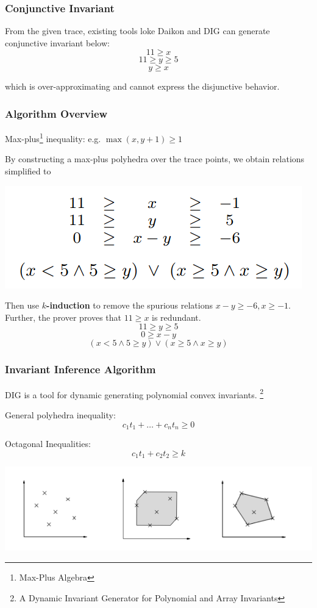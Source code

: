 \documentclass[11pt]{beamer}
\begin{document}
\begin{frame}\frametitle{Conjunctive Invariant}
From the given trace, existing tools loke Daikon and DIG can generate conjunctive invariant below:
\[11\ge x\]\[11 \ge y \ge 5\]\[y \ge x\]

which is over-approximating and cannot express the disjunctive behavior.
\end{frame}
\begin{frame}\frametitle{Algorithm Overview}
Max-plus\footnote{Max-Plus Algebra} inequality: e.g. $\max(x, y+1) \ge 1$

By constructing a max-plus polyhedra over the trace points, we obtain relations simplified to 
\begin{center}
\includegraphics[scale=0.4]{2.png}
\end{center}
Then use $k$\textbf{-induction} to remove the spurious relations $x - y \ge -6, x \ge -1$. Further, the prover proves that $11 \ge x$ is redundant.
\[11 \ge y  \ge 5\]
\[0 \ge x - y\]
\[(x < 5 \wedge 5 \ge y)\vee(x \ge 5 \wedge x \ge y)\]
\end{frame}

\begin{frame}\frametitle{Invariant Inference Algorithm}
DIG is a tool for dynamic generating polynomial convex invariants. \footnote{A Dynamic Invariant Generator for Polynomial and Array Invariants}

General polyhedra inequality:
\[c_1t_1+\ldots + c_nt_n \ge 0\]

Octagonal Inequalities:
\[c_1t_1 + c_2t_2 \ge k\]



\begin{center}
\includegraphics[scale=0.3]{10.png}
\end{center}
\end{frame}
\end{document}
